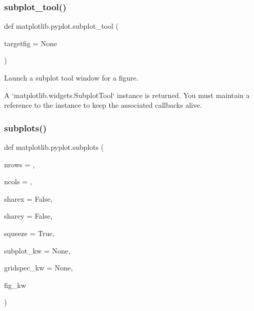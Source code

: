 \subsubsection{\texorpdfstring{subplot\+\_\+tool()}{subplot\_tool()}}
{\footnotesize\ttfamily def matplotlib.\+pyplot.\+subplot\+\_\+tool (\begin{DoxyParamCaption}\item[{}]{targetfig = {\ttfamily None} }\end{DoxyParamCaption})}

\begin{DoxyVerb}Launch a subplot tool window for a figure.

A `matplotlib.widgets.SubplotTool` instance is returned. You must maintain
a reference to the instance to keep the associated callbacks alive.
\end{DoxyVerb}
 \mbox{\label{namespacematplotlib_1_1pyplot_a777939c1af7108efa460136a1eabc962}} 
\subsubsection{\texorpdfstring{subplots()}{subplots()}}
{\footnotesize\ttfamily def matplotlib.\+pyplot.\+subplots (\begin{DoxyParamCaption}\item[{}]{nrows = {},  }\item[{}]{ncols = {},  }\item[{}]{sharex = {\ttfamily False},  }\item[{}]{sharey = {\ttfamily False},  }\item[{}]{squeeze = {\ttfamily True},  }\item[{}]{subplot\+\_\+kw = {\ttfamily None},  }\item[{}]{gridspec\+\_\+kw = {\ttfamily None},  }\item[{}]{fig\+\_\+kw }\end{DoxyParamCaption})}

